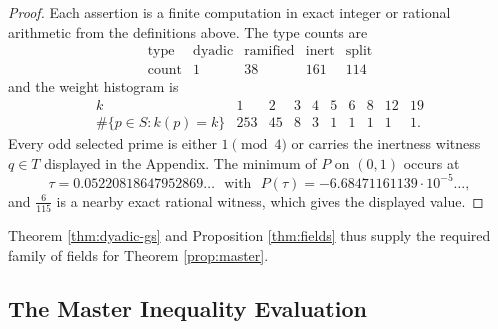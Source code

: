 \begin{proof}
Each assertion is a finite computation in exact integer or rational arithmetic from the definitions above.  The type counts are
\[
\begin{array}{c|cccc}
\text{type} & \text{dyadic} & \text{ramified} & \text{inert} & \text{split}\\
\hline
\text{count} & 1&38&161&114
\end{array}
\]
and the weight histogram is
\[
\begin{array}{c|ccccccccc}
 k&1&2&3&4&5&6&8&12&19\\
\hline
 \#\{p\in S:k(p)=k\}&253&45&8&3&1&1&1&1&1.
\end{array}
\]
Every odd selected prime is either $1\pmod{4}$ or carries the inertness witness $q\in T$ displayed in the Appendix.  The minimum of $P$ on $(0,1)$ occurs at
\[
   \tau=0.05220818647952869\ldots\ \ \ \text{with}\ \ \ P(\tau)=-6.68471161139\cdot10^{-5}\ldots,
\]
and $\frac6{115}$ is a nearby exact rational witness, which gives the displayed value.
\end{proof}

\noindent Theorem \ref{thm:dyadic-gs} and Proposition \ref{thm:fields} thus supply the required family of fields for Theorem \ref{prop:master}.

\subsection{The Master Inequality Evaluation}

